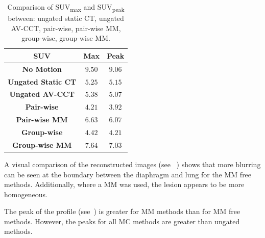    \begin{table}
        \centering
        
        \captionsetup{singlelinecheck=false, justification=centering}
        \caption{Comparison of \gls{SUV}\textsubscript{max} and \gls{SUV}\textsubscript{peak} between: ungated static \gls{CT}, ungated \gls{AV-CCT}, pair-wise, pair-wise \gls{MM}, group-wise, group-wise \gls{MM}.}
        
        \resizebox*{1.0\linewidth}{!}
        {
            \begin{tabular}{||c|cc||}
                \hline
                \textbf{\gls{SUV}}                  & \textbf{Max}  & \textbf{Peak} \\
                \hline
                \textbf{No Motion}                  & $9.50$        & $9.06$ \\
                \hline
                \textbf{Ungated Static \gls{CT}}    & $5.25$        & $5.15$ \\
                \textbf{Ungated \gls{AV-CCT}}       & $5.38$        & $5.07$ \\
                \hline
                \textbf{Pair-wise}                  & $4.21$        & $3.92$ \\
                \textbf{Pair-wise \gls{MM}}         & $6.63$        & $6.07$ \\
                \hline
                \textbf{Group-wise}                 & $4.42$        & $4.21$ \\
                \textbf{Group-wise \gls{MM}}        & $7.64$        & $7.03$ \\
                \hline
            \end{tabular}
        }
        
        \label{tab:suv}
        
    \end{table}
    
    A visual comparison of the reconstructed images (see ~) shows that more blurring can be seen at the boundary between the diaphragm and lung for the \gls{MM} free methods. Additionally, where a \gls{MM} was used, the lesion appears to be more homogeneous.
     
    The peak of the profile (see~) is greater for \gls{MM} methods than for \gls{MM} free methods. However, the peaks for all \gls{MC} methods are greater than ungated methods.
     
